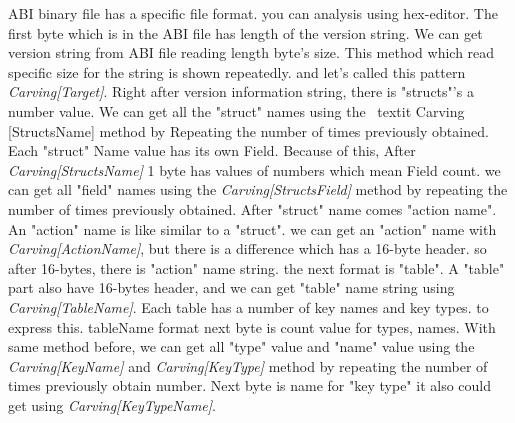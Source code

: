 ABI binary file has a specific file format. you can analysis using hex-editor. 
The first byte which is in the ABI file has length of the version string. We can get version string from ABI file reading length byte's size. This method which read specific size for the string is shown repeatedly. and let's called this pattern  \textit{ Carving[Target]}. Right after version information string, there is "structs"'s a number value. We can get all the "struct" names using the \ textit {Carving [StructsName]} method by Repeating the number of times previously obtained.
Each "struct" Name value has its own Field.
Because of this, After \textit{Carving[StructsName]} 1 byte has values of numbers which mean Field count. we can get all "field" names using the \textit{Carving[StructsField]} method by repeating the number of times previously obtained. 
After "struct" name comes "action name". 
An "action" name is like similar to a "struct". we can get an "action" name with \textit{Carving[ActionName]}, but there is a difference which has a 16-byte header. so after 16-bytes, there is "action" name string.
the next format is "table".
A "table" part also have 16-bytes header, and we can get "table" name string using \textit{Carving[TableName]}.
Each table has a number of key names and key types. to express this. tableName format next byte is count value for types, names. With same method before, we can get all "type" value and "name" value using the \textit{Carving[KeyName]} and \textit{Carving[KeyType]} method by repeating the number of times previously obtain number. Next byte is name for "key type" it also could get using \textit{Carving[KeyTypeName]}.



